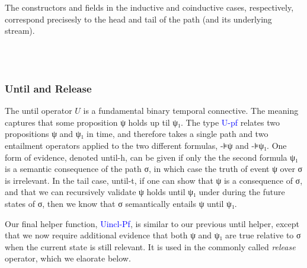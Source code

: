 \documentclass{article}
\newcommand{\blue}[1]{\textcolor{blue}{#1}}
\newcommand{\green}[1]{\textcolor{hooker\'sgreen}{#1}}
\begin{document}
The constructors and fields in the inductive and coinductive cases,
respectively, correspond precisesly to the head and tail of the path (and its
underlying stream).


\begin{code}%
%
\>[2]\AgdaSpace{}%
\AgdaSpace{}%
\AgdaSymbol{(}\AgdaSpace{}%
\AgdaSymbol{:}\AgdaSpace{}%
\AgdaSpace{}%
\AgdaSpace{}%
\AgdaSymbol{)}\AgdaSpace{}%
\AgdaSymbol{(}\AgdaSpace{}%
\AgdaSymbol{:}\AgdaSpace{}%
\AgdaSymbol{)}\AgdaSpace{}%
\AgdaSymbol{:}\AgdaSpace{}%
\AgdaSpace{}%
\<%
\\
\>[2][@{}l@{\AgdaIndent{0}}]%
\>[4]\AgdaSpace{}%
\AgdaSymbol{:}\AgdaSpace{}%
\AgdaSpace{}%
\AgdaSpace{}%
\AgdaSpace{}%
\AgdaSpace{}%
\AgdaSpace{}%
\<%
\\
%
\>[4]\AgdaSpace{}%
\AgdaSymbol{:}\AgdaSpace{}%
\AgdaSpace{}%
\AgdaSpace{}%
\AgdaSymbol{(}\AgdaSpace{}%
\AgdaSymbol{)}\AgdaSpace{}%
\AgdaSymbol{->}\AgdaSpace{}%
\AgdaSpace{}%
\AgdaSpace{}%
\<%
\end{code}

\subsubsection{Until and Release}

The until operator $U$ is a fundamental binary temporal connective. The meaning
captures that some proposition ψ holds up til ψ₁. The type \blue{U-pf} relates
two propositions ψ and ψ₁ in time, and therefore takes a single path and two
entailment operators applied to the two different formulas, -⊧ψ and -⊧ψ₁. One
form of evidence, denoted \green{until-h}, can be given if only the the second
formula ψ₁ is a semantic consequence of the path σ, in which case the truth of
event ψ over σ is irrelevant. In the tail case, \green{until-t}, if one can show
that ψ is a consequence of σ, and that we can recursively validate ψ holds until
ψ₁ under during the future states of σ, then we know that σ semantically
entails ψ until ψ₁.

Our final helper function, \blue{Uincl-Pf}, is similar to our previous until
helper, except that we now require additional evidence that both ψ and ψ₁ are
true relative to σ when the current state is still relevant. It is used in the
commonly called \emph{release} operator, which we elaorate below.
\end{document}
